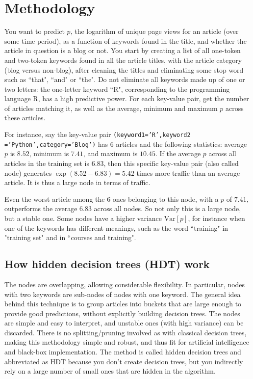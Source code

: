 \documentclass[oneside,10pt]{book}
\begin{document}
\section{Methodology}

You want to predict $p$, the logarithm of unique page views for an article (over some time period), as a function of keywords found in the title, and whether the article in question is a blog or not.  You start by creating a list of all one-token and two-token keywords found in all the article titles, with the article category (blog versus non-blog), after cleaning the titles and eliminating some stop word such as ``that", ``and" or ``the". Do not eliminate all keywords made up of one or two letters: the one-letter keyword ``R", corresponding to the programming language R, has a high \textcolor{index}{predictive power}.
For each key-value pair, get the number of articles matching it, as well as the average, minimum and maximum $p$ across these articles.

For instance, say the  key-value pair \texttt{(keyword1='R',keyword2 ='Python',category='Blog')} has $6$ articles and  the following statistics: average $p$ is $8.52$, minimum
 is $7.41$, and maximum is $10.45$. If the average $p$ across all articles in the training set is  $6.83$, then this specific key-value pair (also called node) generates $\exp(8.52 - 6.83) = 5.42$ times more traffic than an average article. It is thus a large node in terms of traffic.

Even the worst article among the $6$ ones belonging to this node, with a $p$ of $7.41$, outperforms the average $6.83$ across all nodes. So not only this is a large node, but a stable one. Some nodes have a higher variance $\text{Var}[p]$, for instance when one of the keywords has different meanings, such as the word ``training" in "training set"  and in
 ``courses and training".


\subsection{How hidden decision trees (HDT) work}\label{algoaba}

The nodes are overlapping, allowing considerable flexibility. In particular, nodes with two keywords are sub-nodes of nodes with one keyword.
The general idea behind this technique is to group articles into buckets that are large enough to provide good predictions, without explicitly building \textcolor{index}{decision trees}.  The nodes are simple and easy to interpret, and unstable ones (with high variance) can be discarded. There is no splitting/pruning involved as with classical decision trees, making this methodology simple and robust, and thus fit for artificial intelligence and black-box implementation. The method is called
 \textcolor{index}{hidden decision trees} and abbreviated as \textcolor{index}{HDT} because you don't create decision trees, but you indirectly rely on a large number of small ones that are hidden in the
 algorithm.
\end{document}
